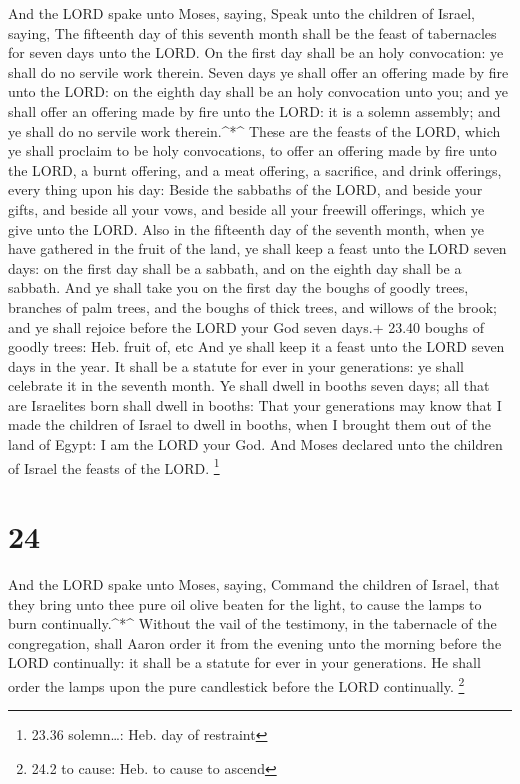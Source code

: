  And the LORD spake unto Moses, saying,  Speak
unto the children of Israel, saying, The fifteenth day of this seventh
month shall be the feast of tabernacles for seven days unto the LORD.
 On the first day shall be an holy convocation: ye shall do
no servile work therein.  Seven days ye shall offer an
offering made by fire unto the LORD: on the eighth day shall be an holy
convocation unto you; and ye shall offer an offering made by fire unto
the LORD: it is a solemn assembly; and ye shall do no servile work
therein.\^{}*\^{}  These are the feasts of the LORD, which
ye shall proclaim to be holy convocations, to offer an offering made by
fire unto the LORD, a burnt offering, and a meat offering, a sacrifice,
and drink offerings, every thing upon his day:  Beside the
sabbaths of the LORD, and beside your gifts, and beside all your vows,
and beside all your freewill offerings, which ye give unto the LORD.
 Also in the fifteenth day of the seventh month, when ye
have gathered in the fruit of the land, ye shall keep a feast unto the
LORD seven days: on the first day shall be a sabbath, and on the eighth
day shall be a sabbath.  And ye shall take you on the first
day the boughs of goodly trees, branches of palm trees, and the boughs
of thick trees, and willows of the brook; and ye shall rejoice before
the LORD your God seven days.+ 23.40 boughs of goodly trees: Heb. fruit
of, etc  And ye shall keep it a feast unto the LORD seven
days in the year. It shall be a statute for ever in your generations: ye
shall celebrate it in the seventh month.  Ye shall dwell in
booths seven days; all that are Israelites born shall dwell in booths:
 That your generations may know that I made the children of
Israel to dwell in booths, when I brought them out of the land of Egypt:
I am the LORD your God.  And Moses declared unto the
children of Israel the feasts of the LORD. \footnote{23.36 solemn\ldots:
  Heb. day of restraint}

\hypertarget{section-23}{%
\section{24}\label{section-23}}

 And the LORD spake unto Moses, saying,  Command
the children of Israel, that they bring unto thee pure oil olive beaten
for the light, to cause the lamps to burn continually.\^{}*\^{}
 Without the vail of the testimony, in the tabernacle of the
congregation, shall Aaron order it from the evening unto the morning
before the LORD continually: it shall be a statute for ever in your
generations.  He shall order the lamps upon the pure
candlestick before the LORD continually. \footnote{24.2 to cause: Heb.
  to cause to ascend}

